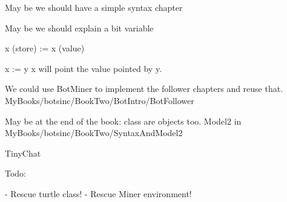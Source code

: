 


May be we should have a simple syntax chapter


	
	


May be we should explain a bit variable

	x (store) := x (value)
	
	x := y 
	x will point the value pointed by y. 
	

We could use BotMiner to implement the follower chapters and reuse that. 
	MyBooks/botsinc/BookTwo/BotIntro/BotFollower

May be at the end of the book: class are objects too. 
	Model2 in MyBooks/botsinc/BookTwo/SyntaxAndModel2
	

TinyChat

Todo: 

- Rescue turtle class!
- Rescue Miner environment!

